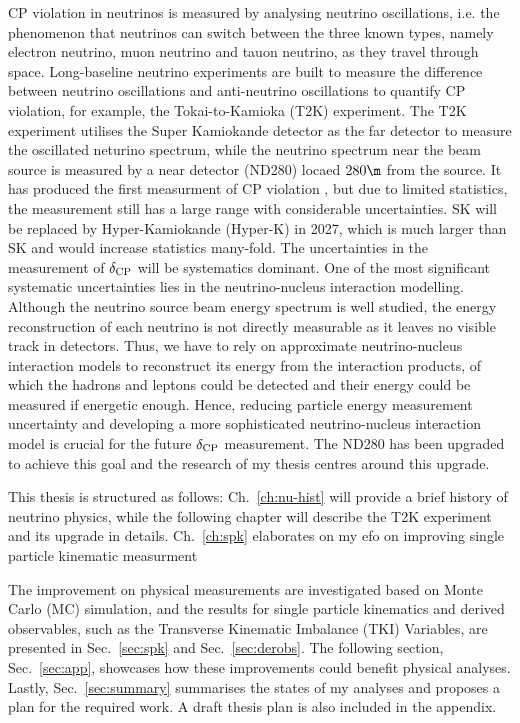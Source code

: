    CP violation in neutrinos is measured by analysing neutrino oscillations, i.e. the phenomenon that neutrinos can switch between the three known types, namely electron neutrino, muon neutrino and tauon neutrino, as they travel through space. 
   Long-baseline neutrino experiments are built to measure the difference between neutrino oscillations and anti-neutrino oscillations to quantify CP violation, for example, the Tokai-to-Kamioka (T2K) experiment. 
   The T2K experiment utilises the Super Kamiokande detector as the far detector to measure the oscillated neturino spectrum, while the neutrino spectrum near the beam source is measured by a near detector (ND280) locaed $280\m$ from the source. 
   It has produced the first measurment of CP violation \cite{T2Knature}, but due to limited statistics, the measurement still has a large range with considerable uncertainties.
   SK will be replaced by Hyper-Kamiokande (Hyper-K) in 2027, which is much larger than SK and would increase statistics many-fold. 
   The uncertainties in the measurement of $\delta_\textrm{CP}$ will be systematics dominant. 
   One of the most significant systematic uncertainties lies in the neutrino-nucleus interaction modelling. 
   Although the neutrino source beam energy spectrum is well studied, the energy reconstruction of each neutrino is not directly measurable as it leaves no visible track in detectors. 
   Thus, we have to rely on approximate neutrino-nucleus interaction models to reconstruct its energy from the interaction products, of which the hadrons and leptons could be detected and their energy could be measured if energetic enough. 
   Hence, reducing particle energy measurement uncertainty and developing a more sophisticated neutrino-nucleus interaction model is crucial for the future $\delta_\textrm{CP}$ measurement. 
   The ND280 has been upgraded to achieve this goal and the research of my thesis centres around this upgrade. 

   This thesis is structured as follows: Ch.~\ref{ch:nu-hist} will provide a brief history of neutrino physics, while the following chapter will describe the T2K experiment and its upgrade in details. 
   Ch.~\ref{ch:spk} elaborates on my efo on improving single particle kinematic measurment 

   The improvement on physical measurements are investigated based on Monte Carlo (MC) simulation, and the results for single particle kinematics and derived observables, such as the Transverse Kinematic Imbalance (TKI) Variables, are presented in Sec.~\ref{sec:spk} and Sec.~\ref{sec:derobs}. 
   The following section, Sec.~\ref{sec:app}, showcases how these improvements could benefit physical analyses. Lastly, Sec.~\ref{sec:summary} summarises the states of my analyses and proposes a plan for the required work. A draft thesis plan is also included in the appendix.



